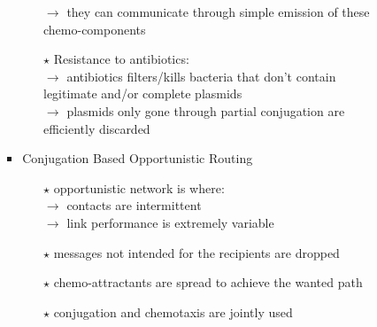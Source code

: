 \begin{itemize}
\begin{itemize}
\begin{itemize}
\begin{itemize}
\begin{enumerate}
\begin{enumerate}
                    \end{enumerate}
                    \hspace*{0.3cm}$\rightarrow$ they can communicate through simple emission of these\\
                    \hspace*{0.3cm}chemo-components
                    \item[$\star$] Resistance to antibiotics:\\[0.15cm]
                    \hspace*{0.3cm}$\rightarrow$ antibiotics filters/kills bacteria that don't contain\\
                    \hspace*{0.3cm}legitimate and/or complete plasmids\\[0.15cm]
                    \hspace*{0.3cm}$\rightarrow$ plasmids only gone through partial conjugation are\\
                    \hspace*{0.3cm}efficiently discarded
                \end{enumerate}
                \item Conjugation Based Opportunistic Routing
                \begin{enumerate}
                    \addtolength{\itemindent}{0.3cm}
                    \item[$\star$] opportunistic network is where:\\[0.15cm]
                    \hspace*{0.3cm}$\rightarrow$ contacts are intermittent\\[0.15cm]
                    \hspace*{0.3cm}$\rightarrow$ link performance is extremely variable
                    \item[$\star$] messages not intended for the recipients are dropped
                    \item[$\star$] chemo-attractants are spread to achieve the wanted path
                    \item[$\star$] conjugation and chemotaxis are jointly used
                \end{enumerate}
            \end{itemize}
        \end{itemize}
    \end{itemize}
    \begin{figure}[!h] 
        \centering 

\end{figure}
\end{itemize}
